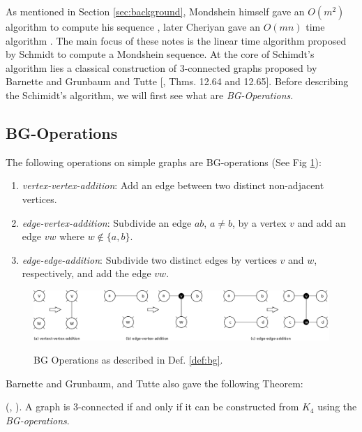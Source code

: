 As mentioned in Section \ref{sec:background}, Mondshein himself gave an $O(m^2)$ algorithm to compute his sequence \cite{mond}, later Cheriyan gave an $O(mn)$ time algorithm \cite{cheriyan}.
The main focus of these notes is the linear time algorithm proposed by Schmidt \cite{Schmidt13a} to compute a Mondshein sequence.
At the core of Schimdt's algorithm lies a classical construction of 3-connected graphs proposed by Barnette and Grunbaum \cite{bg} and Tutte [\cite{tutteConnectivity}, Thms. 12.64 and 12.65].
Before describing the Schimidt's algorithm, we will first see what are \textit{BG-Operations}.

\subsection{BG-Operations}

\begin{defn} \label{def:bg}
The following operations on simple graphs are BG-operations (See Fig \ref{fig:bg}):
\begin{enumerate}
\item \textit{vertex-vertex-addition}: Add an edge between two distinct non-adjacent vertices.
\item \textit{edge-vertex-addition}: Subdivide an edge $ab$, $a \ne b$, by a vertex $v$ and add an edge $vw$ where $w \notin \{a,b\}$.
\item \textit{edge-edge-addition}: Subdivide two distinct edges by vertices $v$ and $w$, respectively, and add the edge $vw$.
\end{enumerate}
\end{defn}

\begin{figure}
    \centering
    \includegraphics[scale=0.3]{bg.png} \\
    \caption{BG Operations as described in Def. \ref{def:bg}.}
    \label{fig:bg}
\end{figure}

Barnette and Grunbaum, and Tutte also gave the following Theorem:

\begin{thm} \label{thm:k4bg}
(\cite{bg}, \cite{tutteConnectivity}). A graph is 3-connected if and only if it can be constructed from $K_4$ using the \textit{BG-operations}.
\end{thm}

